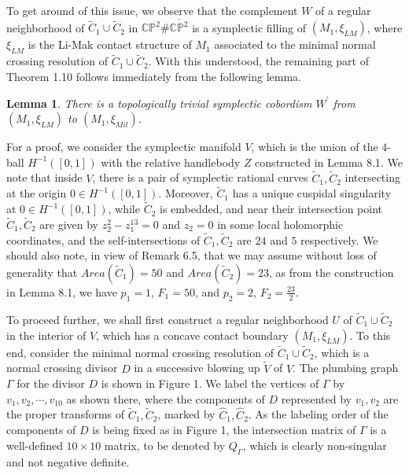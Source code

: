 \documentclass[11pt]{amsart}
\theoremstyle{plain}
\numberwithin{theorem}{section}
\newtheorem{lemma}[theorem]{Lemma}
\theoremstyle{definition}
\newcommand{\C}{{\mathbb C}}
\renewcommand{\P}{{\mathbb P}}
\begin{document}
To get around of this issue, we observe that the complement $W$ of a regular neighborhood of 
$\tilde{C}_1\cup \tilde{C}_2$ in $\C\P^2\#\overline{\C\P^2}$ is a symplectic filling of $(M_1,\xi_{LM})$, where
$\xi_{LM}$ is the Li-Mak contact structure of $M_1$ associated to the minimal normal crossing resolution of 
$\tilde{C}_1\cup \tilde{C}_2$. With this understood, the remaining part of Theorem 1.10
follows immediately from the following lemma. 

\begin{lemma}
There is a topologically trivial symplectic cobordism $W^\prime$ from $(M_1,\xi_{LM})$ to $(M_1,\xi_{Mil})$.
\end{lemma}

For a proof, we consider the symplectic manifold $V$, which is the union of the $4$-ball $H^{-1}([0,1])$ with
the relative handlebody $Z$ constructed in Lemma 8.1. We note that inside $V$, there is a pair of symplectic rational curves $\tilde{C}_1,\tilde{C}_2$ intersecting at the origin $0\in H^{-1}([0,1])$. Moreover, $\tilde{C}_1$
has a unique cuspidal singularity at $0\in H^{-1}([0,1])$, while $\tilde{C}_2$ is embedded, and near their intersection 
point $\tilde{C}_1,\tilde{C}_2$ are given by $z_2^2-z_1^{13}=0$ and $z_2=0$ in some local holomorphic coordinates, and the self-intersections of $\tilde{C}_1,\tilde{C}_2$ are $24$ and $5$ respectively. We should also note, in view of Remark 6.5, that we may assume without loss of generality that 
$Area(\tilde{C}_1)=50$ and $Area(\tilde{C}_2)=23$, as from the construction in Lemma 8.1, we have
$p_1=1$, $F_1=50$, and $p_2=2$, $F_2=\frac{23}{2}$. 

To proceed further, we shall first construct a regular neighborhood $U$ of $\tilde{C}_1\cup \tilde{C}_2$ in the interior of $V$, which has a concave contact boundary $(M_1,\xi_{LM})$. To this end, consider the minimal normal crossing 
resolution of $\tilde{C}_1\cup \tilde{C}_2$, which is a normal crossing divisor $D$ in a successive blowing up
$\tilde{V}$ of $V$. The plumbing graph $\Gamma$ for the divisor $D$ is shown in Figure 1. We label the vertices of
$\Gamma$ by $v_1,v_2,\cdots,v_{10}$ as shown there, where the components of $D$ represented by $v_1,v_2$
are the proper transforms of $\tilde{C}_1,\tilde{C}_2$, marked by $\hat{C}_1, \hat{C}_2$. As the labeling order of the components of $D$ is being fixed as in Figure 1, the intersection matrix of $\Gamma$ is a well-defined 
$10\times 10$ matrix, to be denoted by $Q_\Gamma$, which is clearly non-singular and not negative definite. 
																		
\end{document}
